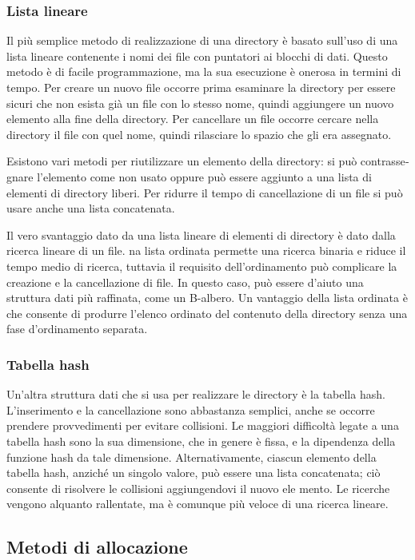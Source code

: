 \documentclass[11pt,a4paper]{article}
\begin{document}
{\subsubsection{Lista lineare}
Il più semplice metodo di realizzazione di una directory è basato sull'uso di una lista lineare
contenente i nomi dei file con puntatori ai blocchi di dati. Questo metodo è di facile programmazione, ma la sua esecuzione è onerosa in termini di tempo. Per creare un nuovo file
occorre prima esaminare la directory per essere sicuri che non esista già un file con lo stesso
nome, quindi aggiungere un nuovo elemento alla fine della directory. Per cancellare un file
occorre cercare nella directory il file con quel nome, quindi rilasciare lo spazio che gli era as­segnato.

Esistono vari metodi per riutilizzare un elemento della directory: si può contrasse­gnare l'elemento come non usato oppure può essere aggiunto a una lista di elementi di directory liberi. Per ridurre il
tempo di cancellazione di un file si può usare anche una lista concatenata.

Il vero svantaggio dato da una lista lineare di elementi di directory è dato dalla ricerca
lineare di un file. na lista ordinata permette una ricerca binaria e riduce il tempo medio di ri­cerca, tuttavia il requisito dell'ordinamento può complicare la creazione e la cancellazione di
file. In questo caso, può essere d'aiuto una struttura dati più raffi­nata, come un B-albero. Un vantaggio della lista ordinata è che consente di produrre l'elen­co ordinato del contenuto della directory senza una fase d'ordinamento separata.

\subsubsection{Tabella hash}
Un'altra struttura dati che si usa per realizzare le directory è la tabella hash. L'inserimento e la cancellazione sono abba­stanza semplici, anche se occorre prendere provvedimenti per evitare collisioni. Le maggiori difficoltà legate a una tabella hash sono la sua dimensione, che in genere
è fissa, e la dipendenza della funzione hash da tale dimensione. Alternativamente, ciascun elemento della tabella hash, anziché un singolo valore, può
essere una lista concatenata; ciò consente di risolvere le collisioni aggiungendovi il nuovo ele­
mento. Le ricerche vengono alquanto rallentate, ma è comunque più veloce di una ricerca lineare.

\subsection{Metodi di allocazione}
}
\end{document}
